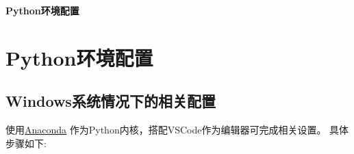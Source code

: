 \documentclass[11pt]{article}
\begin{document}
    \newpage
    
    \newpage
    \\
    \\ \\
    {\Huge \textbf{Python环境配置}}
    \newpage
    
    \section{Python环境配置}
    \subsection{Windows系统情况下的相关配置}
    使用\underline{Anaconda} 作为Python内核，搭配VSCode作为编辑器可完成相关设置。
    具体步骤如下:
\end{document}
